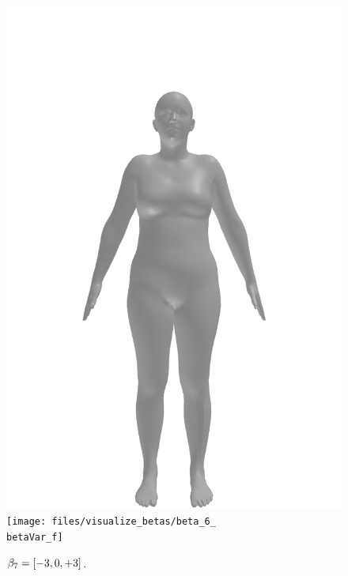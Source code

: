 \begin{figure}[ht!]
\begin{minipage}[b]{\textwidth}
        \includegraphics[width=\imgWidth]{files/visualize_betas/baseline_f}
        \texttt{[image: files/visualize\_betas/beta\_6\_\\betaVar\_f]}
        \caption[Effect of varying $\beta_7$ in SMPL.]{$\beta_7 = [-3, 0, +3]$.}
    \end{minipage}
\end{figure}

